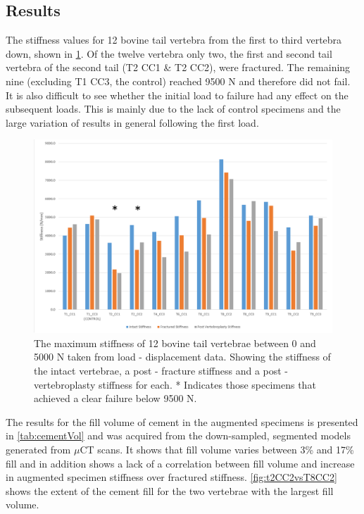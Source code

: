 \subsection{Results}\label{results}

The stiffness values for 12 bovine tail vertebra from the first to third
vertebra down, shown in \cref{fig:allexpData}. Of the twelve vertebra only two,
the first and second tail vertebra of the second tail (T2 CC1 \& T2 CC2), were
fractured. The remaining nine (excluding T1 CC3, the control) reached 9500 N
and therefore did not fail. It is also difficult to see whether the initial
load to failure had any effect on the subsequent loads. This is mainly due to
the lack of control specimens and the large variation of results in general
following the first load.

\begin{figure}[ht!]
\centering
\includegraphics[width=\textwidth]{images/All_experimental_Data.png}
\caption{The maximum stiffness of 12 bovine tail vertebrae between 0 and 5000 N taken from load - displacement data. Showing the stiffness of the intact vertebrae, a post - fracture stiffness and a post - vertebroplasty stiffness for each. * Indicates those specimens that achieved a clear failure below 9500 N.}
\label{fig:allexpData}
\end{figure}

The results for the fill volume of cement in the augmented specimens is
presented in \cref{tab:cementVol} and was acquired from the down-sampled,
segmented models generated from $\mu$CT scans. It shows that fill volume varies
between 3\% and 17\% fill and in addition shows a lack of a correlation between
fill volume and increase in augmented specimen stiffness over fractured
stiffness. \cref{fig:t2CC2vsT8CC2} shows the extent of the cement fill for the
two vertebrae with the largest fill volume.

